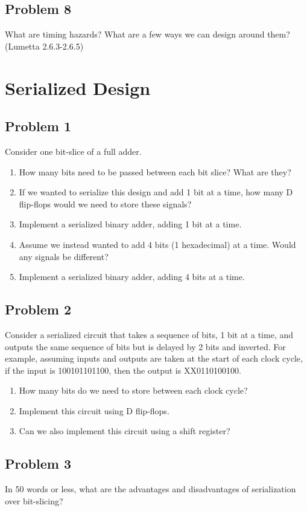 \documentclass{article}
\begin{document}
\subsection*{Problem 8}
What are timing hazards? What are a few ways we can design around them? (Lumetta 2.6.3-2.6.5)

\newpage
\section*{Serialized Design}
\subsection*{Problem 1}
Consider one bit-slice of a full adder.
\begin{enumerate}[label=\alph*.]
    \item How many bits need to be passed between each bit slice? What are they?
    \item If we wanted to serialize this design and add 1 bit at a time, how many D flip-flops would we need to store these signals?
    \item Implement a serialized binary adder, adding 1 bit at a time.
    \item Assume we instead wanted to add 4 bits (1 hexadecimal) at a time. Would any signals be different?
    \item Implement a serialized binary adder, adding 4 bits at a time.
\end{enumerate}


\subsection*{Problem 2}
Consider a serialized circuit that takes a sequence of bits, 1 bit at a time, and outputs the same sequence of bits but is delayed by 2 bits and inverted. For example, assuming inputs and outputs are taken at the start of each clock cycle, if the input is 100101101100, then the output is XX0110100100.
\begin{enumerate}[label=\alph*.]
    \item How many bits do we need to store between each clock cycle?
    \item Implement this circuit using D flip-flops.
    \item Can we also implement this circuit using a shift register?
\end{enumerate}


\subsection*{Problem 3}
In 50 words or less, what are the advantages and disadvantages of serialization over bit-slicing?
\end{document}

